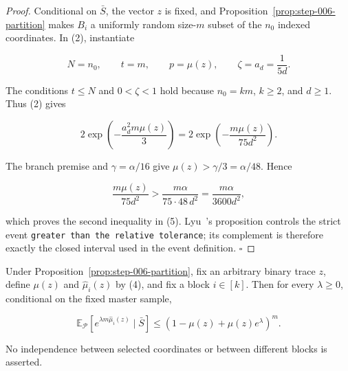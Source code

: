 \begin{proof}
Conditional on \(\bar S\), the vector \(z\) is fixed, and
Proposition~\ref{prop:step-006-partition} makes \(B_i\) a uniformly random
size-\(m\) subset of the \(n_0\) indexed coordinates.  In (2), instantiate

\[
 N=n_0,\qquad t=m,\qquad p=\mu(z),\qquad \zeta=a_d=\frac1{5d}.
\]

The conditions \(t\leq N\) and \(0<\zeta<1\) hold because
\(n_0=km\), \(k\geq2\), and \(d\geq1\).  Thus (2) gives

\[
 2\exp\!\left(-\frac{a_d^2m\mu(z)}3\right)
 =2\exp\!\left(-\frac{m\mu(z)}{75d^2}\right).
\]

The branch premise and \(\gamma=\alpha/16\) give
\(\mu(z)>\gamma/3=\alpha/48\).  Hence

\[
 \frac{m\mu(z)}{75d^2}
 >\frac{m\alpha}{75\cdot48\,d^2}
 =\frac{m\alpha}{3600d^2},
\]

which proves the second inequality in (5).  Lyu~\citep{lyu2025}'s proposition controls the
strict event \texttt{greater than the relative tolerance}; its complement is
therefore exactly the closed interval used in the event definition.
\(\square\)


\end{proof}

\begin{lemma}\label{lem:step-006-mgf}
Under Proposition~\ref{prop:step-006-partition}, fix an arbitrary binary
trace \(z\), define \(\mu(z)\) and \(\widehat\mu_i(z)\) by (4), and fix a
block \(i\in[k]\).  Then for every \(\lambda\geq0\), conditional on the
fixed master sample,

\[
 \mathbb E_{\mathcal P}
 \left[e^{\lambda m\widehat\mu_i(z)}\mid\bar S\right]
 \leq \left(1-\mu(z)+\mu(z)e^\lambda\right)^m.
\tag{6}
\]

No independence between selected coordinates or between different blocks
is asserted.


\end{lemma}

